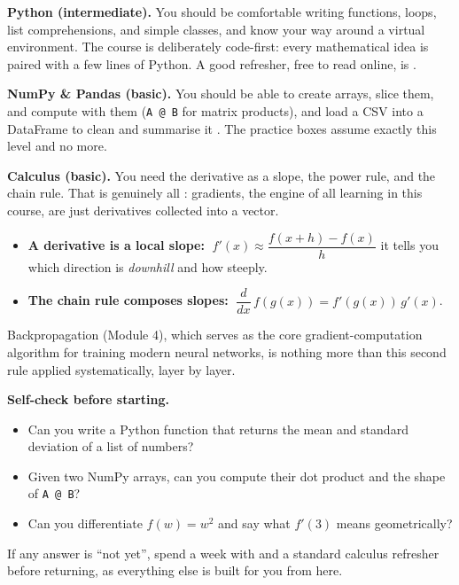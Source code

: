 \documentclass[11pt,a4paper]{article}
\begin{document}
	\textbf{Python (intermediate).} You should be comfortable writing
	functions, loops, list comprehensions, and simple classes, and know your
	way around a virtual environment. The course is deliberately code-first:
	every mathematical idea is paired with a few lines of Python. A good
	refresher, free to read online, is \textcite{vanderplas2016}.
	
	\textbf{NumPy \& Pandas (basic).} You should be able to create arrays,
	slice them, and compute with them (\texttt{A @ B} for matrix products),
	and load a CSV into a DataFrame to clean and summarise it
	\parencite{harris2020, mckinney2010}. The practice boxes assume exactly
	this level and no more.
	
	\textbf{Calculus (basic).} You need the derivative as a slope, the power
	rule, and the chain rule. That is genuinely all : gradients, the engine
	of all learning in this course, are just derivatives collected into a
	vector.
	
	\begin{keyconcept}
		\begin{itemize}
			\item \textbf{A derivative is a local slope:}
			$\;f'(x) \approx \dfrac{f(x+h)-f(x)}{h}$ it tells you which
			direction is \emph{downhill} and how steeply.
			\item \textbf{The chain rule composes slopes:}
			$\;\dfrac{d}{dx}\,f(g(x)) = f'(g(x))\,g'(x)$.
		\end{itemize}
		Backpropagation (Module 4), which serves as the core gradient-computation algorithm for training modern
		neural networks, is nothing more than this second rule applied
		systematically, layer by layer.
	\end{keyconcept}
	
	\textbf{Self-check before starting.}
	\begin{itemize}
		\item Can you write a Python function that returns the mean and standard
		deviation of a list of numbers?
		\item Given two NumPy arrays, can you compute their dot product and the
		shape of \texttt{A @ B}?
		\item Can you differentiate $f(w) = w^2$ and say what $f'(3)$ means
		geometrically?
	\end{itemize}
	If any answer is ``not yet'', spend a week with \textcite{vanderplas2016}
	and a standard calculus refresher before returning, as everything else is
	built for you from here.
	
\end{document}
